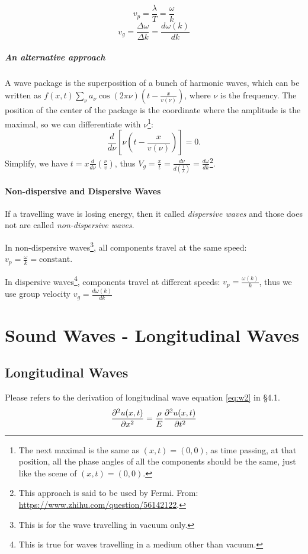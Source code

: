 \documentclass[openany]{book}
\begin{document}
\begin{equation}\label{eq:12}
v_p=\frac{\lambda }{T}=\frac{\omega }{k}
\end{equation}
\begin{equation}\label{eq:13}
v_g=\frac{\Delta \omega }{\Delta k}=\frac{d\omega (k)}{dk}
\end{equation}

\paragraph{An alternative approach}
A wave package is the superposition of a bunch of harmonic
waves, which can be written as $f(x,t)\sum_\nu a_\nu 
\cos(2\pi\nu)\left(t-\frac{x}{v(\nu)}\right)$, where 
$\nu$ is the frequency. The position of the center of the
package is the coordinate where the amplitude is the maximal,
so we can differentiate with $\nu$\footnote{The next maximal is
the same as $(x,t)=(0,0)$, as time passing, at that position,
all the phase angles of all the components should be the same,
just like the scene of $(x,t)=(0,0)$.}:
\[\frac{d}{d\nu}[\nu(t-\frac{x}{v(\nu)})]=0.\]
Simplify, we have $t=x\frac{d}{d\nu}(\frac{\nu}{v})$, thus 
$V_g=\frac{x}{t}=\frac{d\nu}{d(\frac{1}{\lambda})}=\frac{d\omega}{dk}$\footnote{This approach is said to be used by Fermi. From: 
\url{https://www.zhihu.com/question/56142122}.}.

\subsubsection{Non-dispersive and Dispersive Waves}
If a travelling wave is losing energy, then it called \emph{dispersive waves} and those does not are called \emph{non-dispersive waves}.

In non-dispersive waves\footnote{This is for the wave travelling in vacuum only.}, all components travel at the same speed: $v_p=\frac{\omega }{k}=\text{constant}$.

In dispersive waves\footnote{This is true for waves travelling in a medium other than vacuum.}, components travel at different speeds: $v_p=\frac{\omega (k)}{k}$, thus we use group velocity $v_g=\frac{d\omega (k)}{dk}$

\chapter{Sound Waves - Longitudinal Waves}
\section{Longitudinal Waves}
Please refers to the derivation of longitudinal wave equation \eqref{eq:w2} in \S 4.1.
\begin{equation}
{\partial^2 u(x,t) \over \partial x^2 }={ \rho\over E}{\partial^2 u(x,t) \over \partial t^2}
\end{equation}
\end{document}

